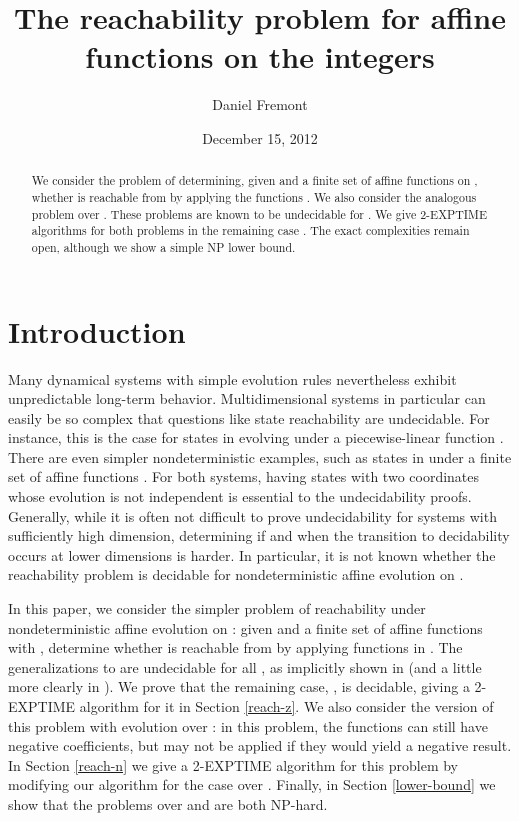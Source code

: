 \documentclass[11pt]{amsart}
\title{The reachability problem for affine functions on the integers}
\author{Daniel Fremont}
\date{December 15, 2012}
\theoremstyle{definition}
\theoremstyle{remark}
\begin{document}
\begin{abstract}
We consider the problem of determining, given  and a finite set  of affine functions on , whether  is reachable from  by applying the functions . We also consider the analogous problem over . These problems are known to be undecidable  for . We give \textsf{2-EXPTIME} algorithms for both problems in the remaining case . The exact complexities remain open, although we show a simple \textsf{NP} lower bound.
\end{abstract}

\maketitle

\section{Introduction}

Many dynamical systems with simple evolution rules nevertheless exhibit unpredictable long-term behavior. Multidimensional systems in particular can easily be so complex that questions like state reachability are undecidable. For instance, this is the case for states in  evolving under a piecewise-linear function \cite{koiran}. There are even simpler nondeterministic examples, such as states in  under a finite set of affine functions \cite{bell-potapov}. For both systems, having states with two coordinates whose evolution is not independent is essential to the undecidability proofs. Generally, while it is often not difficult to prove undecidability for systems with sufficiently high dimension, determining if and when the transition to decidability occurs at lower dimensions is harder. In particular, it is not known whether the reachability problem is decidable for nondeterministic affine evolution on .

In this paper, we consider the simpler problem of reachability under nondeterministic affine evolution on : given  and a finite set  of affine functions  with , determine whether  is reachable from  by applying functions in . The generalizations to  are undecidable for all , as implicitly shown in \cite{paterson} (and a little more clearly in \cite[Section 4.9]{gaubert-katz}). We prove that the remaining case, , is decidable, giving a \textsf{2-EXPTIME} algorithm for it in Section \ref{reach-z}. We also consider the version of this problem with evolution over : in this problem, the functions  can still have negative coefficients, but may not be applied if they would yield a negative result. In Section \ref{reach-n} we give a \textsf{2-EXPTIME} algorithm for this problem by modifying our algorithm for the case over . Finally, in Section \ref{lower-bound} we show that the problems over  and  are both \textsf{NP}-hard.
\end{document}

